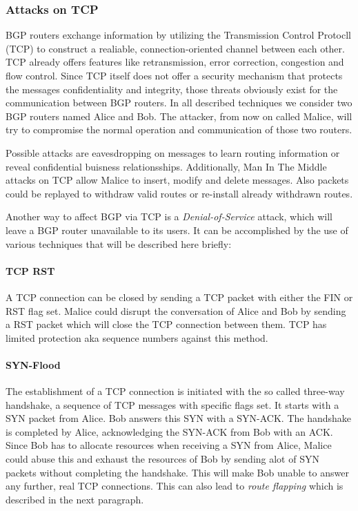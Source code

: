 \documentclass[12pt]{IEEEtran}
\begin{document}
	       	\subsubsection{Attacks on TCP}
		BGP routers exchange information by utilizing the Transmission Control Protocll (TCP) to construct a realiable, connection-oriented channel between each other. 
		TCP already offers features like retransmission, error correction, congestion and flow control. 
		Since TCP itself does not offer a security mechanism that protects the messages confidentiality and integrity, those threats obviously exist for the communication between BGP routers. 
		In all described techniques we consider two BGP routers named Alice and Bob. The attacker, from now on called Malice, will try to compromise the normal operation and communication of those two routers.

		Possible attacks are eavesdropping on messages to learn routing information or reveal confidential buisness relationsships.
		Additionally, Man In The Middle attacks on TCP allow Malice to insert, modify and delete messages. 
		Also packets could be replayed to withdraw valid routes or re-install already withdrawn routes.
	
		Another way to affect BGP via TCP is a \emph{Denial-of-Service} attack, which will leave a BGP router unavailable to its users.
		It can be accomplished by the use of various techniques that will be described here briefly:
		\paragraph{TCP RST}
		A TCP connection can be closed by sending a TCP packet with either the FIN or RST flag set. 
		Malice could disrupt the conversation of Alice and Bob by sending a RST packet which will close the TCP connection between them. TCP has limited protection aka sequence numbers against this method. 

		\paragraph{SYN-Flood}
		The establishment of a TCP connection is initiated with the so called three-way handshake, a sequence of TCP messages with specific flags set. It starts with a SYN packet from Alice. Bob answers this SYN with a SYN-ACK. The handshake is completed by Alice, acknowledging the SYN-ACK from Bob with an ACK.
		Since Bob has to allocate resources when receiving a SYN from Alice, Malice could abuse this and exhaust the resources of Bob by sending alot of SYN packets without completing the handshake. This will make Bob unable to answer any further, real TCP connections. This can also lead to \emph{route flapping} which is described in the next paragraph.
\end{document}
